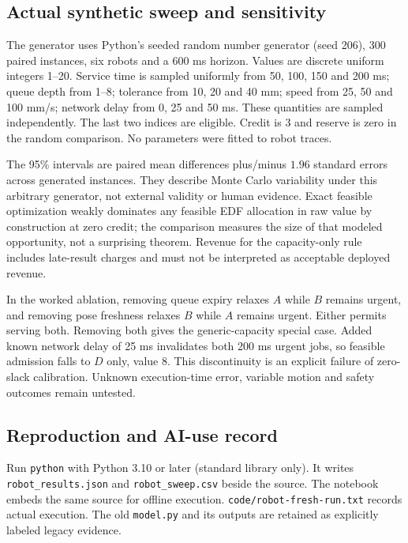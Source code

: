 \subsection{Actual synthetic sweep and sensitivity}

The generator uses Python's seeded random number generator (seed 206), 300 paired instances, six robots and a 600 ms horizon. Values are discrete uniform integers 1--20. Service time is sampled uniformly from 50, 100, 150 and 200 ms; queue depth from 1--8; tolerance from 10, 20 and 40 mm; speed from 25, 50 and 100 mm/s; network delay from 0, 25 and 50 ms. These quantities are sampled independently. The last two indices are eligible. Credit is 3 and reserve is zero in the random comparison. No parameters were fitted to robot traces.

\begin{sloppypar}
The 95\% intervals are paired mean differences plus/minus $1.96$ standard errors across generated instances. They describe Monte Carlo variability under this arbitrary generator, not external validity or human evidence. Exact feasible optimization weakly dominates any feasible EDF allocation in raw value by construction at zero credit; the comparison measures the size of that modeled opportunity, not a surprising theorem. Revenue for the capacity-only rule includes late-result charges and must not be interpreted as acceptable deployed revenue.
\end{sloppypar}

In the worked ablation, removing queue expiry relaxes $A$ while $B$ remains urgent, and removing pose freshness relaxes $B$ while $A$ remains urgent. Either permits serving both. Removing both gives the generic-capacity special case. Added known network delay of 25 ms invalidates both 200 ms urgent jobs, so feasible admission falls to $D$ only, value 8. This discontinuity is an explicit failure of zero-slack calibration. Unknown execution-time error, variable motion and safety outcomes remain untested.

\subsection{Reproduction and AI-use record}
Run \texttt{python}  with Python 3.10 or later (standard library only). It writes \texttt{robot\_results.json} and \texttt{robot\_sweep.csv} beside the source. The notebook embeds the same source for offline execution. \texttt{code/robot-fresh-run.txt} records actual execution. The old \texttt{model.py} and its outputs are retained as explicitly labeled legacy evidence.

